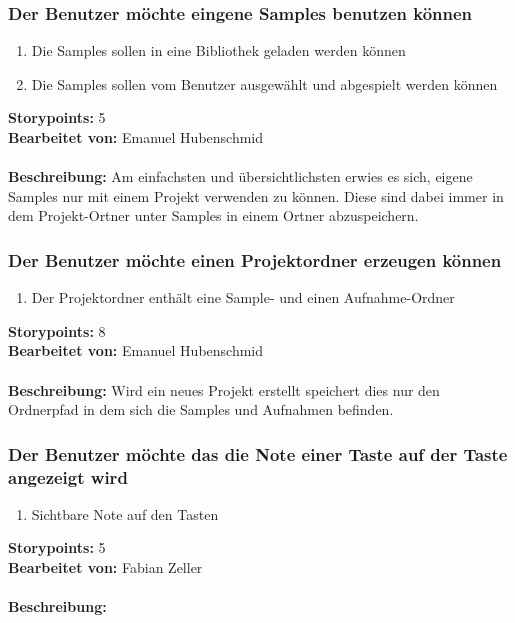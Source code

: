 \subsubsection{Der Benutzer möchte eingene Samples benutzen können}

\begin{enumerate}
 \item Die Samples sollen in eine Bibliothek geladen werden können
 \item Die Samples sollen vom Benutzer ausgewählt und abgespielt werden können
\end{enumerate}

\textbf{Storypoints:} 5 \\
\textbf{Bearbeitet von:} Emanuel Hubenschmid \\
\\
\textbf{Beschreibung:} Am einfachsten und übersichtlichsten erwies es sich, eigene Samples nur mit 
einem Projekt verwenden zu können. Diese sind dabei immer in dem Projekt-Ortner unter Samples in 
einem Ortner abzuspeichern.


\subsubsection{Der Benutzer möchte einen Projektordner erzeugen können}

\begin{enumerate}
 \item Der Projektordner enthält eine Sample- und einen Aufnahme-Ordner
\end{enumerate}

\textbf{Storypoints:} 8 \\
\textbf{Bearbeitet von:} Emanuel Hubenschmid \\
\\
\textbf{Beschreibung:} Wird ein neues Projekt erstellt speichert dies nur den Ordnerpfad in dem 
sich die Samples und Aufnahmen befinden.


\subsubsection{Der Benutzer möchte das die Note einer Taste auf der Taste angezeigt wird}

\begin{enumerate}
 \item Sichtbare Note auf den Tasten
\end{enumerate}

\textbf{Storypoints:} 5 \\
\textbf{Bearbeitet von:} Fabian Zeller \\
\\
\textbf{Beschreibung:} 


